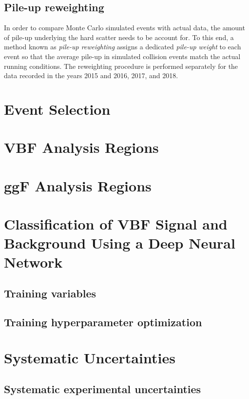\subsection{Pile-up reweighting}
In order to compare Monte Carlo simulated events with actual data, the amount of pile-up underlying the hard scatter needs to be account for.
To this end, a method known as \emph{pile-up reweighting} assigns a dedicated \emph{pile-up weight} to each event so that the average pile-up in simulated collision events match the actual running conditions. The reweighting procedure is performed separately for the data recorded in the years 2015 and 2016, 2017, and 2018.



\section{Event Selection}
\section{VBF Analysis Regions}
\section{ggF Analysis Regions}

\section{Classification of VBF Signal and Background Using a Deep Neural Network}
\subsection{Training variables}
\subsection{Training hyperparameter optimization}

\section{Systematic Uncertainties}
\subsection{Systematic experimental uncertainties}
